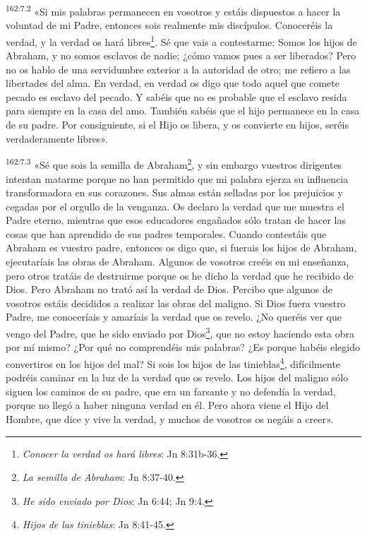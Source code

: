 \par
\textsuperscript{162:7.2} «Si mis palabras permanecen en vosotros y estáis dispuestos a hacer la voluntad de mi Padre, entonces sois realmente mis discípulos. Conoceréis la verdad, y la verdad os hará libres\footnote{\textit{Conocer la verdad os hará libres}: Jn 8:31b-36.}. Sé que vais a contestarme: Somos los hijos de Abraham, y no somos esclavos de nadie; ¿cómo vamos pues a ser liberados? Pero no os hablo de una servidumbre exterior a la autoridad de otro; me refiero a las libertades del alma. En verdad, en verdad os digo que todo aquel que comete pecado es esclavo del pecado. Y sabéis que no es probable que el esclavo resida para siempre en la casa del amo. También sabéis que el hijo permanece en la casa de su padre. Por consiguiente, si el Hijo os libera, y os convierte en hijos, seréis verdaderamente libres».

\par
\textsuperscript{162:7.3} «Sé que sois la semilla de Abraham\footnote{\textit{La semilla de Abraham}: Jn 8:37-40.}, y sin embargo vuestros dirigentes intentan matarme porque no han permitido que mi palabra ejerza su influencia transformadora en sus corazones. Sus almas están selladas por los prejuicios y cegadas por el orgullo de la venganza. Os declaro la verdad que me muestra el Padre eterno, mientras que esos educadores engañados sólo tratan de hacer las cosas que han aprendido de sus padres temporales. Cuando contestáis que Abraham es vuestro padre, entonces os digo que, si fuerais los hijos de Abraham, ejecutaríais las obras de Abraham. Algunos de vosotros creéis en mi enseñanza, pero otros tratáis de destruirme porque os he dicho la verdad que he recibido de Dios. Pero Abraham no trató así la verdad de Dios. Percibo que algunos de vosotros estáis decididos a realizar las obras del maligno. Si Dios fuera vuestro Padre, me conoceríais y amaríais la verdad que os revelo. ¿No queréis ver que vengo del Padre, que he sido enviado por Dios\footnote{\textit{He sido enviado por Dios}: Jn 6:44; Jn 9:4.}, que no estoy haciendo esta obra por mí mismo? ¿Por qué no comprendéis mis palabras? ¿Es porque habéis elegido convertiros en los hijos del mal? Si sois los hijos de las tinieblas\footnote{\textit{Hijos de las tinieblas}: Jn 8:41-45.}, difícilmente podréis caminar en la luz de la verdad que os revelo. Los hijos del maligno sólo siguen los caminos de su padre, que era un farsante y no defendía la verdad, porque no llegó a haber ninguna verdad en él. Pero ahora viene el Hijo del Hombre, que dice y vive la verdad, y muchos de vosotros os negáis a creer».

